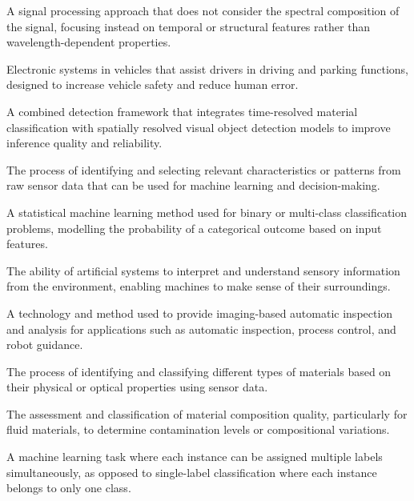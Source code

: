 \documentclass[12pt,a4paper,oneside]{report}
\begin{document}
{\begin{description}[leftmargin=3cm, style=nextline, itemsep=0pt, parsep=0pt, topsep=0pt, partopsep=0pt]
    \item[Achromatic processing] A signal processing approach that does not consider the spectral composition of the signal, focusing instead on temporal or structural features rather than wavelength-dependent properties.
    
    \item[Advanced driving assistance systems] Electronic systems in vehicles that assist drivers in driving and parking functions, designed to increase vehicle safety and reduce human error.
    
    \item[Dual detection model] A combined detection framework that integrates time-resolved material classification with spatially resolved visual object detection models to improve inference quality and reliability.
    
    \item[Feature extraction] The process of identifying and selecting relevant characteristics or patterns from raw sensor data that can be used for machine learning and decision-making.
    
    \item[Logistic regression] A statistical machine learning method used for binary or multi-class classification problems, modelling the probability of a categorical outcome based on input features.
    
    \item[Machine perception] The ability of artificial systems to interpret and understand sensory information from the environment, enabling machines to make sense of their surroundings.
    
    \item[Machine vision] A technology and method used to provide imaging-based automatic inspection and analysis for applications such as automatic inspection, process control, and robot guidance.
    
    \item[Material detection] The process of identifying and classifying different types of materials based on their physical or optical properties using sensor data.
    
    \item[Material purity detection] The assessment and classification of material composition quality, particularly for fluid materials, to determine contamination levels or compositional variations.
    
    \item[Multi-label classification] A machine learning task where each instance can be assigned multiple labels simultaneously, as opposed to single-label classification where each instance belongs to only one class.
    

\end{description}}
\end{document}
